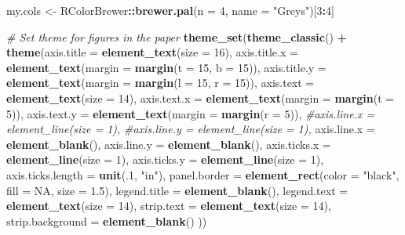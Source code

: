 \documentclass[]{article}
\newenvironment{Shaded}{\begin{snugshade}}{\end{snugshade}}
\newcommand{\KeywordTok}[1]{\textcolor[rgb]{0.13,0.29,0.53}{\textbf{#1}}}
\newcommand{\DataTypeTok}[1]{\textcolor[rgb]{0.13,0.29,0.53}{#1}}
\newcommand{\DecValTok}[1]{\textcolor[rgb]{0.00,0.00,0.81}{#1}}
\newcommand{\FloatTok}[1]{\textcolor[rgb]{0.00,0.00,0.81}{#1}}
\newcommand{\StringTok}[1]{\textcolor[rgb]{0.31,0.60,0.02}{#1}}
\newcommand{\CommentTok}[1]{\textcolor[rgb]{0.56,0.35,0.01}{\textit{#1}}}
\newcommand{\OtherTok}[1]{\textcolor[rgb]{0.56,0.35,0.01}{#1}}
\newcommand{\OperatorTok}[1]{\textcolor[rgb]{0.81,0.36,0.00}{\textbf{#1}}}
\newcommand{\NormalTok}[1]{#1}
\begin{document}
\begin{Shaded}
\begin{Highlighting}[]
\NormalTok{my.cols <-}\StringTok{ }\NormalTok{RColorBrewer}\OperatorTok{::}\KeywordTok{brewer.pal}\NormalTok{(}\DataTypeTok{n =} \DecValTok{4}\NormalTok{, }\DataTypeTok{name =} \StringTok{"Greys"}\NormalTok{)[}\DecValTok{3}\OperatorTok{:}\DecValTok{4}\NormalTok{]}

\CommentTok{# Set theme for figures in the paper}
\KeywordTok{theme_set}\NormalTok{(}\KeywordTok{theme_classic}\NormalTok{() }\OperatorTok{+}\StringTok{ }
\StringTok{  }\KeywordTok{theme}\NormalTok{(}\DataTypeTok{axis.title =} \KeywordTok{element_text}\NormalTok{(}\DataTypeTok{size =} \DecValTok{16}\NormalTok{),}
        \DataTypeTok{axis.title.x =} \KeywordTok{element_text}\NormalTok{(}\DataTypeTok{margin =} \KeywordTok{margin}\NormalTok{(}\DataTypeTok{t =} \DecValTok{15}\NormalTok{, }\DataTypeTok{b =} \DecValTok{15}\NormalTok{)),}
        \DataTypeTok{axis.title.y =} \KeywordTok{element_text}\NormalTok{(}\DataTypeTok{margin =} \KeywordTok{margin}\NormalTok{(}\DataTypeTok{l =} \DecValTok{15}\NormalTok{, }\DataTypeTok{r =} \DecValTok{15}\NormalTok{)),}
        \DataTypeTok{axis.text =} \KeywordTok{element_text}\NormalTok{(}\DataTypeTok{size =} \DecValTok{14}\NormalTok{),}
        \DataTypeTok{axis.text.x =} \KeywordTok{element_text}\NormalTok{(}\DataTypeTok{margin =} \KeywordTok{margin}\NormalTok{(}\DataTypeTok{t =} \DecValTok{5}\NormalTok{)),}
        \DataTypeTok{axis.text.y =} \KeywordTok{element_text}\NormalTok{(}\DataTypeTok{margin =} \KeywordTok{margin}\NormalTok{(}\DataTypeTok{r =} \DecValTok{5}\NormalTok{)),}
        \CommentTok{#axis.line.x = element_line(size = 1),}
        \CommentTok{#axis.line.y = element_line(size = 1),}
        \DataTypeTok{axis.line.x =} \KeywordTok{element_blank}\NormalTok{(),}
        \DataTypeTok{axis.line.y =} \KeywordTok{element_blank}\NormalTok{(),}
        \DataTypeTok{axis.ticks.x =} \KeywordTok{element_line}\NormalTok{(}\DataTypeTok{size =} \DecValTok{1}\NormalTok{),}
        \DataTypeTok{axis.ticks.y =} \KeywordTok{element_line}\NormalTok{(}\DataTypeTok{size =} \DecValTok{1}\NormalTok{),}
        \DataTypeTok{axis.ticks.length =} \KeywordTok{unit}\NormalTok{(.}\DecValTok{1}\NormalTok{, }\StringTok{"in"}\NormalTok{),}
        \DataTypeTok{panel.border =} \KeywordTok{element_rect}\NormalTok{(}\DataTypeTok{color =} \StringTok{"black"}\NormalTok{, }\DataTypeTok{fill =} \OtherTok{NA}\NormalTok{, }\DataTypeTok{size =} \FloatTok{1.5}\NormalTok{),}
        \DataTypeTok{legend.title =} \KeywordTok{element_blank}\NormalTok{(),}
        \DataTypeTok{legend.text =} \KeywordTok{element_text}\NormalTok{(}\DataTypeTok{size =} \DecValTok{14}\NormalTok{),}
        \DataTypeTok{strip.text =} \KeywordTok{element_text}\NormalTok{(}\DataTypeTok{size =} \DecValTok{14}\NormalTok{),}
        \DataTypeTok{strip.background =} \KeywordTok{element_blank}\NormalTok{()}
\NormalTok{        ))}
\end{Highlighting}
\end{Shaded}
\end{document}
